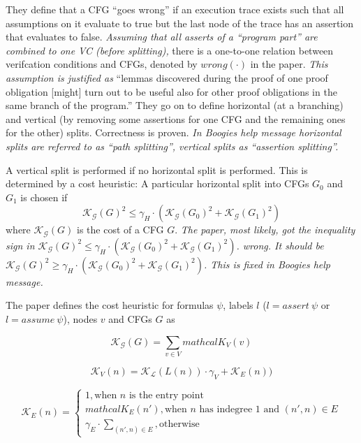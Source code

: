 \documentclass{scrartcl}
\begin{document}
They define that a CFG \enquote{goes wrong} if an execution trace exists
such that all assumptions on it evaluate to true but the last node of the trace has an assertion
that evaluates to false.
\textit{Assuming that all asserts of a \enquote{program part} are combined to one VC
(before splitting),}
there is a one-to-one relation between verifcation conditions and CFGs,
denoted by \(wrong(\cdot)\) in the paper.
\textit{This assumption is justified as }
\enquote{lemmas discovered during the proof of one proof obligation [might] turn out to be useful    
also for other proof obligations in the same branch of the program.}
They go on to define horizontal (at a branching) and vertical
(by removing some assertions for one CFG and the remaining ones for the other) splits.
Correctness is proven.
\textit{In Boogies help message horizontal splits are referred to as \enquote{path splitting},
    vertical splits as \enquote{assertion splitting}.}


A vertical split is performed if no horizontal split is performed.
This is determined by a cost heuristic:
A particular horizontal split into CFGs \(G_0\) and \(G_1\) is chosen if 
\[
    \mathcal{K}_\mathcal{G}(G)^2 \le \gamma_H
    \cdot (\mathcal{K}_\mathcal{G}(G_0)^2 + \mathcal{K}_\mathcal{G}(G_1)^2)
\]
where \(\mathcal{K}_\mathcal{G}(G)\) is the cost of a CFG \(G\).
\textit{The paper, most likely, got the inequality sign in
    \(\mathcal{K}_\mathcal{G}(G)^2 \le \gamma_H
    \cdot (\mathcal{K}_\mathcal{G}(G_0)^2 + \mathcal{K}_\mathcal{G}(G_1)^2)\).
    wrong. It should be
    \(\mathcal{K}_\mathcal{G}(G)^2 \ge \gamma_H
    \cdot (\mathcal{K}_\mathcal{G}(G_0)^2 + \mathcal{K}_\mathcal{G}(G_1)^2)\).
    This is fixed in Boogies help message.
}

The paper defines the cost heuristic for formulas \(\psi\),
labels \(l\) (\(l = assert\ \psi\) or \(l = assume\ \psi\)),
nodes \(v\) and CFGs \(G\) as

\[\mathcal{K}_\mathcal{G}(G) = \sum_{v\in V} mathcal{K}_V(v)\]
        
\[\mathcal{K}_V(n) = \mathcal{K}_\mathcal{L}(L(n)) \cdot \gamma_V + \mathcal{K}_E(n))\]
    
\[\mathcal{K}_E(n) =
    \begin{cases}
        1, \text{when \(n\) is the entry point}\\
        mathcal{K}_E(n'), \text{when \(n\) has indegree 1 and \((n', n) \in E\)}\\
        \gamma_E \cdot \sum_{(n', n) \in E}, \text{otherwise}
    \end{cases}
\]
\end{document}
